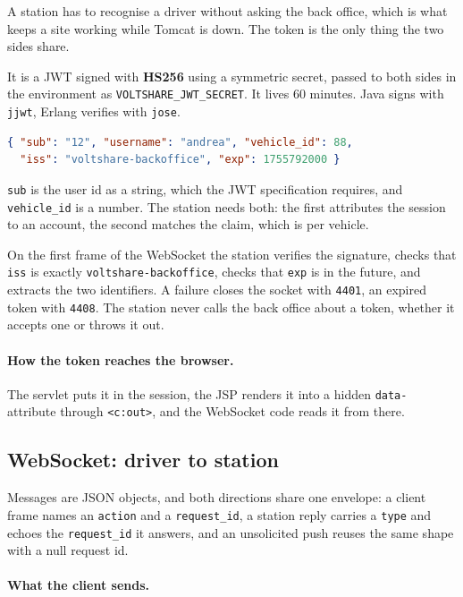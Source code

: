 A station has to recognise a driver without asking the back office, which is what keeps a
site working while Tomcat is down. The token is the only thing the two sides share.

It is a JWT signed with \textbf{HS256} using a symmetric secret, passed to both sides in the
environment as \texttt{VOLTSHARE\_JWT\_SECRET}. It lives 60 minutes. Java signs with \texttt{jjwt},
Erlang verifies with \texttt{jose}.

\begin{lstlisting}[language=json, caption={The claims, plus the standard \texttt{iat}.},
                   label={lst:jwt}]
{ "sub": "12", "username": "andrea", "vehicle_id": 88,
  "iss": "voltshare-backoffice", "exp": 1755792000 }
\end{lstlisting}

\texttt{sub} is the user id as a string, which the JWT specification requires, and
\texttt{vehicle\_id} is a number. The station needs both: the first attributes the session
to an account, the second matches the claim, which is per vehicle.

On the first frame of the WebSocket the station verifies the signature, checks that \texttt{iss} is exactly
\texttt{voltshare-backoffice}, checks that \texttt{exp} is in the future, and extracts the
two identifiers. A failure closes the socket with \texttt{4401}, an expired token with
\texttt{4408}. The station never calls the back office about a token, whether it accepts one
or throws it out.

\paragraph{How the token reaches the browser.} The servlet puts it in the session, the JSP
renders it into a hidden \texttt{data-} attribute through \texttt{<c:out>}, and the
WebSocket code reads it from there. 

\subsection{WebSocket: driver to station}
\label{sec:api-ws-driver}

Messages are JSON objects, and both directions share one envelope: a client
frame names an \texttt{action} and a \texttt{request\_id}, a station reply carries a
\texttt{type} and echoes the \texttt{request\_id} it answers, and an unsolicited push reuses
the same shape with a null request id.

\paragraph{What the client sends.}

